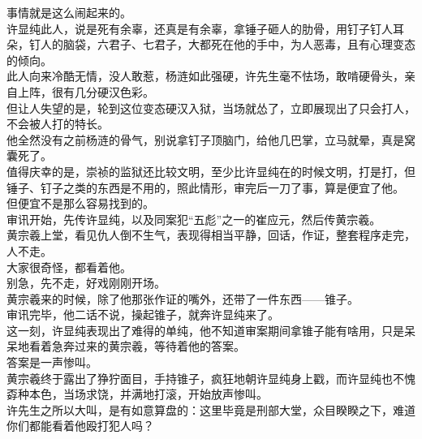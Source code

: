 \begin{multicols}{\theparacolNo}
事情就是这么闹起来的。\\

许显纯此人，说是死有余辜，还真是有余辜，拿锤子砸人的肋骨，用钉子钉人耳朵，钉人的脑袋，六君子、七君子，大都死在他的手中，为人恶毒，且有心理变态的倾向。\\

此人向来冷酷无情，没人敢惹，杨涟如此强硬，许先生毫不怯场，敢啃硬骨头，亲自上阵，很有几分硬汉色彩。\\

但让人失望的是，轮到这位变态硬汉入狱，当场就怂了，立即展现出了只会打人，不会被人打的特长。\\

他全然没有之前杨涟的骨气，别说拿钉子顶脑门，给他几巴掌，立马就晕，真是窝囊死了。\\

值得庆幸的是，崇祯的监狱还比较文明，至少比许显纯在的时候文明，打是打，但锤子、钉子之类的东西是不用的，照此情形，审完后一刀了事，算是便宜了他。\\

但便宜不是那么容易找到的。\\

审讯开始，先传许显纯，以及同案犯“五彪”之一的崔应元，然后传黄宗羲。\\

黄宗羲上堂，看见仇人倒不生气，表现得相当平静，回话，作证，整套程序走完，人不走。\\

大家很奇怪，都看着他。\\

别急，先不走，好戏刚刚开场。\\

黄宗羲来的时候，除了他那张作证的嘴外，还带了一件东西——锥子。\\

审讯完毕，他二话不说，操起锥子，就奔许显纯来了。\\

这一刻，许显纯表现出了难得的单纯，他不知道审案期间拿锥子能有啥用，只是呆呆地看着急奔过来的黄宗羲，等待着他的答案。\\

答案是一声惨叫。\\

黄宗羲终于露出了狰狞面目，手持锥子，疯狂地朝许显纯身上戳，而许显纯也不愧孬种本色，当场求饶，并满地打滚，开始放声惨叫。\\

许先生之所以大叫，是有如意算盘的：这里毕竟是刑部大堂，众目睽睽之下，难道你们都能看着他殴打犯人吗？\\


\end{multicols}
